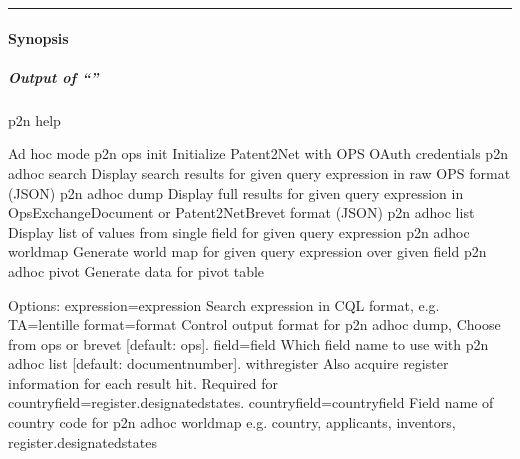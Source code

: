 \documentclass[letterpaper,10pt,english]{sphinxmanual}
\begin{document}
\bigskip\hrule\bigskip



\paragraph{Synopsis}
\label{\detokenize{usage/adhoc:synopsis}}

\subparagraph{Output of “”}
\label{\detokenize{usage/adhoc:output-of-p2n-help}}
\begin{sphinxVerbatim}[commandchars=\\\{\}]
\PYGZdl{} p2n \PYGZhy{}\PYGZhy{}help

\PYGZhy{}\PYGZhy{}\PYGZhy{}\PYGZhy{}\PYGZhy{}\PYGZhy{}\PYGZhy{}\PYGZhy{}\PYGZhy{}\PYGZhy{}\PYGZhy{}
Ad hoc mode
\PYGZhy{}\PYGZhy{}\PYGZhy{}\PYGZhy{}\PYGZhy{}\PYGZhy{}\PYGZhy{}\PYGZhy{}\PYGZhy{}\PYGZhy{}\PYGZhy{}
  p2n ops init                          Initialize Patent2Net with OPS OAuth credentials
  p2n adhoc search                      Display search results for given query expression in raw OPS format (JSON)
  p2n adhoc dump                        Display full results for given query expression in OpsExchangeDocument or Patent2NetBrevet format (JSON)
  p2n adhoc list                        Display list of values from single field for given query expression
  p2n adhoc worldmap                    Generate world map for given query expression over given field
  p2n adhoc pivot                       Generate data for pivot table

Options:
  \PYGZhy{}\PYGZhy{}expression=\PYGZlt{}expression\PYGZgt{}             Search expression in CQL format, e.g. \PYGZdq{}TA=lentille\PYGZdq{}
  \PYGZhy{}\PYGZhy{}format=\PYGZlt{}format\PYGZgt{}                     Control output format for \PYGZdq{}p2n adhoc dump\PYGZdq{},
                                        Choose from \PYGZdq{}ops\PYGZdq{} or \PYGZdq{}brevet\PYGZdq{} [default: ops].
  \PYGZhy{}\PYGZhy{}field=\PYGZlt{}field\PYGZgt{}                       Which field name to use with \PYGZdq{}p2n adhoc list\PYGZdq{} [default: document\PYGZus{}number].
  \PYGZhy{}\PYGZhy{}with\PYGZhy{}register                       Also acquire register information for each result hit.
                                        Required for \PYGZdq{}\PYGZhy{}\PYGZhy{}country\PYGZhy{}field=register.designated\PYGZus{}states\PYGZdq{}.
  \PYGZhy{}\PYGZhy{}country\PYGZhy{}field=\PYGZlt{}country\PYGZhy{}field\PYGZgt{}       Field name of country code for \PYGZdq{}p2n adhoc worldmap\PYGZdq{}
                                        e.g. \PYGZdq{}country\PYGZdq{}, \PYGZdq{}applicants\PYGZdq{}, \PYGZdq{}inventors\PYGZdq{}, \PYGZdq{}register.designated\PYGZus{}states\PYGZdq{}


\end{sphinxVerbatim}
\end{document}
